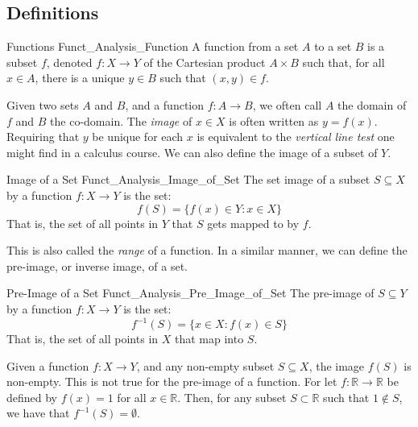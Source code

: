 \documentclass[crop=false,class=book,oneside]{standalone}
\begin{document}
        \subsection{Definitions}
            \begin{ldefinition}{Functions}
                  {Funct_Analysis_Function}
                A \gls{function} from a set $A$ to a set $B$
                is a subset $f$, denoted $f:X\rightarrow{Y}$
                of the Cartesian product $A\times{B}$
                such that, for all $x\in{A}$, there is a unique
                $y\in{B}$ such that $(x,y)\in{f}$.
            \end{ldefinition}
            Given two sets $A$ and $B$, and a function
            $f:A\rightarrow{B}$, we often call $A$ the
            domain of $f$ and $B$ the co-domain.
            The \textit{image} of $x\in{X}$ is often written
            as $y=f(x)$. Requiring that $y$ be unique for each
            $x$ is equivalent to the \textit{vertical line test}
            one might find in a calculus course. We can also
            define the image of a subset of $Y$.
            \begin{ldefinition}{Image of a Set}
                  {Funct_Analysis_Image_of_Set}
                The \gls{set image} of a subset
                $S\subseteq{X}$ by a function
                $f:X\rightarrow{Y}$ is the set:
                \begin{equation}
                    f(S)=\{f(x)\in{Y}:x\in{X}\}
                \end{equation}
                That is, the set of all points in $Y$ that $S$
                gets mapped to by $f$.
            \end{ldefinition}
            This is also called the \textit{range} of a function.
            In a similar manner, we can define the pre-image, or
            inverse image, of a set.
            \begin{ldefinition}{Pre-Image of a Set}
                  {Funct_Analysis_Pre_Image_of_Set}
                The \gls{pre-image} of $S\subseteq{Y}$
                by a function $f:X\rightarrow{Y}$ is the set:
                \begin{equation}
                    f^{\minus{1}}(S)=\{x\in{X}:f(x)\in{S}\}
                \end{equation}
                That is, the set of all points in $X$ that map
                into $S$.
            \end{ldefinition}
            \begin{lexample}
                Given a function $f:X\rightarrow{Y}$, and any
                non-empty subset $S\subseteq{X}$, the image
                $f(S)$ is non-empty. This is not true for the
                pre-image of a function. For let
                $f:\mathbb{R}\rightarrow\mathbb{R}$ be defined by
                $f(x)=1$ for all $x\in\mathbb{R}$. Then, for any
                subset $S\subset\mathbb{R}$ such that
                $1\notin{S}$, we have that
                $f^{\minus{1}}(S)=\emptyset$.
            \end{lexample}
\end{document}
